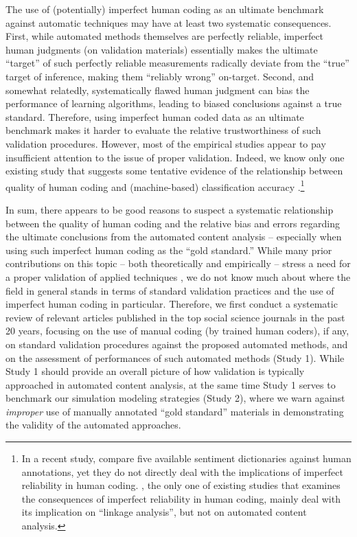 \documentclass[man, floatsintext, 12pt, a4paper, noextraspace]{apa6}
\begin{document}
    The use of (potentially) imperfect human coding as an ultimate benchmark against automatic techniques may have at least two systematic consequences. First, while automated methods themselves are perfectly reliable, imperfect human judgments (on validation materials) essentially makes the ultimate \enquote{target} of such perfectly reliable measurements radically deviate from the \enquote{true} target of inference, making them \enquote{reliably wrong} on-target. Second, and somewhat relatedly, systematically flawed human judgment can bias the performance of learning algorithms, leading to biased conclusions against a true standard. Therefore, using imperfect human coded data as an ultimate benchmark makes it harder to evaluate the relative trustworthiness of such validation procedures. However, most of the empirical studies appear to pay insufficient attention to the issue of proper validation. Indeed, we know only one existing study that suggests some tentative evidence of the relationship between quality of human coding and (machine-based) classification accuracy \parencite{burscher2014teaching}.\footnote{ In a recent study, \textcite{gonzalez2015signals} compare five available sentiment dictionaries against human annotations, yet they do not directly deal with the implications of imperfect reliability in human coding. \textcite{scharkow2017measurement}, the only one of existing studies that examines the consequences of imperfect reliability in human coding, mainly deal with its implication on \enquote{linkage analysis}, but not on automated content analysis.}     
   
    In sum, there appears to be good reasons to suspect a systematic relationship between the quality of human coding and the relative bias and errors regarding the ultimate conclusions from the automated content analysis -- especially when using such imperfect human coding as the \enquote{gold standard.} While many prior contributions on this topic -- both theoretically and empirically -- stress a need for a proper validation of applied techniques \parencites[e.g.,][]{grimmer2013text, Hopkins_King2010, gonzalez2015signals}, we do not know much about where the field in general stands in terms of standard validation practices and the use of imperfect human coding in particular. Therefore, we first conduct a systematic review of relevant articles published in the top social science journals in the past 20 years, focusing on the use of manual coding (by trained human coders), if any, on standard validation procedures against the proposed automated methods, and on the assessment of performances of such automated methods (Study 1). While Study 1 should provide an overall picture of how validation is typically approached in automated content analysis, at the same time Study 1 serves to benchmark our simulation modeling strategies (Study 2), where we warn against \textit{improper} use of manually annotated \enquote{gold standard} materials in demonstrating the validity of the automated approaches.
\end{document}
